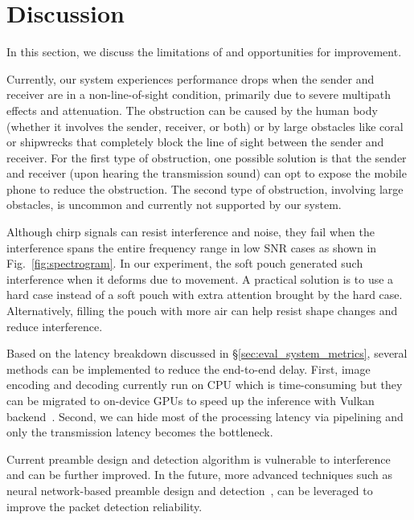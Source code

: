 \section{Discussion}
\label{sec:discussion}
In this section, we discuss the limitations of \sysname and opportunities for improvement.

 Currently, our system experiences performance drops when the sender and receiver are in a non-line-of-sight condition, primarily due to severe multipath effects and attenuation.
The obstruction can be caused by the human body (whether it involves the sender, receiver, or both) or by large obstacles like coral or shipwrecks that completely block the line of sight between the sender and receiver.
For the first type of obstruction, %
one possible solution is that
the sender and receiver (upon hearing the transmission sound) can opt to expose the mobile phone to reduce the obstruction. The second type of obstruction, involving large obstacles, is uncommon and currently not supported by our system.

 Although chirp signals can resist interference and noise, they fail when the interference spans the entire frequency range in low SNR cases as shown in Fig.~\ref{fig:spectrogram}.
In our experiment, the soft pouch generated such interference when it deforms due to movement. A practical solution is to use a hard case instead of a soft pouch with extra attention brought by the hard case. Alternatively, filling the pouch with more air can help resist shape changes and reduce interference.



Based on the latency breakdown discussed in \S\ref{sec:eval_system_metrics}, several methods can be implemented to reduce the end-to-end delay. First, image encoding and decoding currently run on CPU which is time-consuming but they can be migrated to on-device GPUs to speed up the inference with Vulkan backend~\cite{vulkan_2024}.
Second, we can hide most of the processing latency via pipelining and only the transmission latency becomes the bottleneck.


Current preamble design and detection algorithm is vulnerable to interference and can be further improved. In the future, more advanced techniques such as neural network-based preamble design and detection~\cite{yang80neural}, can be leveraged to improve the packet detection reliability.







































